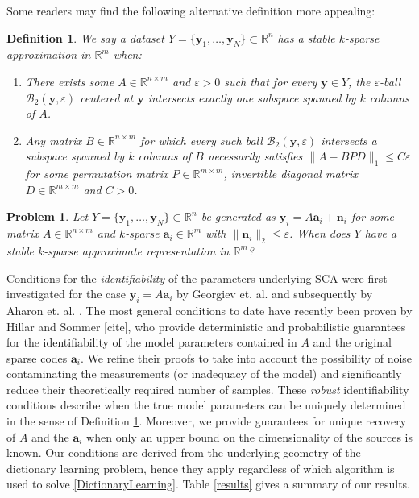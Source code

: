 \documentclass[journal, onecolumn]{IEEEtran}
\newtheorem{problem}{Problem}
\newtheorem{definition}{Definition}
\begin{document}
Some readers may find the following alternative definition more appealing:

\begin{definition}\label{Uniqueness}
We say a dataset $Y = \{\mathbf{y}_1, \ldots, \mathbf{y}_N\} \subset \mathbb{R}^n$ has a stable $k$-sparse approximation in $\mathbb{R}^m$ when:
\begin{enumerate}
\item There exists some $A \in \mathbb{R}^{n \times m}$ and $\varepsilon > 0$ such that for every $\mathbf{y} \in Y$, the $\varepsilon$-ball $\mathcal{B}_2(\mathbf{y}, \varepsilon)$ centered at $\mathbf{y}$ intersects exactly one subspace spanned by $k$ columns of $A$.
\item Any matrix $B \in \mathbb{R}^{n \times m}$ for which every such ball $\mathcal{B}_2(\mathbf{y}, \varepsilon)$ intersects a subspace spanned by $k$ columns of $B$ necessarily satisfies $\|A - BPD\|_1 \leq C\varepsilon$ for some permutation matrix $P \in \mathbb{R}^{m \times m}$, invertible diagonal matrix $D \in \mathbb{R}^{m \times m}$ and $C > 0$.
\end{enumerate}
\end{definition}

\begin{problem}\label{DUTproblem}
Let $Y = \{\mathbf{y}_1, \ldots, \mathbf{y}_N \} \subset \mathbb{R}^n$ be generated as $\mathbf{y}_i = A\mathbf{a}_i  + \mathbf{n}_i$ for some matrix $A \in \mathbb{R}^{n \times m}$ and $k$-sparse $\mathbf{a}_i \in \mathbb{R}^m$ with $\|\mathbf{n}_i\|_2 \leq \varepsilon$. When does $Y$ have a stable $k$-sparse approximate representation in $\mathbb{R}^m$?
\end{problem}

Conditions for the \emph{identifiability} of the parameters underlying SCA were first investigated for the case $\mathbf{y}_i = A\mathbf{a}_i$ by Georgiev et. al. \cite{Georgiev05} and subsequently by Aharon et. al. \cite{Aharon06}. The most general conditions to date have recently been proven by Hillar and Sommer [cite], who provide deterministic and probabilistic guarantees for the identifiability of the model parameters contained in $A$ and the original sparse codes $\mathbf{a}_i$. We refine their proofs to take into account the possibility of noise contaminating the measurements (or inadequacy of the model) and significantly reduce their theoretically required number of samples. These \emph{robust} identifiability conditions describe when the true model parameters can be uniquely determined in the sense of Definition \ref{Uniqueness}. Moreover, we provide guarantees for unique recovery of $A$ and the $\mathbf{a}_i$ when only an upper bound on the dimensionality of the sources is known. Our conditions are derived from the underlying geometry of the dictionary learning problem, hence they apply regardless of which algorithm is used to solve \eqref{DictionaryLearning}. Table \ref{results} gives a summary of our results.
\end{document}
